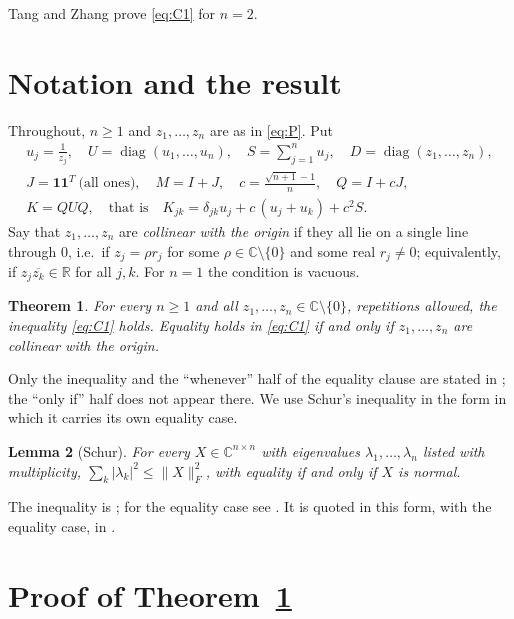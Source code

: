 \documentclass[11pt]{amsart}
\newtheorem{theorem}{Theorem}
\newtheorem{lemma}[theorem]{Lemma}
\theoremstyle{remark}
\newcommand{\CC}{\mathbb{C}}
\newcommand{\RR}{\mathbb{R}}
\newcommand{\Frob}[1]{\lVert #1\rVert_F}
\newcommand{\diag}{\operatorname{diag}}
\begin{document}
Tang and Zhang prove \eqref{eq:C1} for $n=2$.

\section{Notation and the result}

Throughout, $n\ge1$ and $z_1,\ldots,z_n$ are as in \eqref{eq:P}. Put
\begin{gather}
  u_j=\frac{1}{z_j},\quad
  U=\diag(u_1,\ldots,u_n),\quad
  S=\sum_{j=1}^{n}u_j,\quad
  D=\diag(z_1,\ldots,z_n),
  \label{eq:notation}\\
  J=\mathbf{1}\mathbf{1}^{T}\ \text{(all ones)},\quad
  M=I+J,\quad
  c=\frac{\sqrt{n+1}-1}{n},\quad
  Q=I+cJ,
  \label{eq:notation2}\\
  K=QUQ,
  \quad\text{that is}\quad
  K_{jk}=\delta_{jk}u_j+c\,(u_j+u_k)+c^{2}S .
  \label{eq:K}
\end{gather}
Say that $z_1,\ldots,z_n$ are \emph{collinear with the origin} if they all lie
on a single line through $0$, i.e.\ if $z_j=\rho r_j$ for some
$\rho\in\CC\setminus\{0\}$ and some real $r_j\ne0$; equivalently, if
$z_j\overline{z_k}\in\RR$ for all $j,k$. For $n=1$ the condition is vacuous.

\begin{theorem}\label{thm:main}
For every $n\ge1$ and all $z_1,\ldots,z_n\in\CC\setminus\{0\}$, repetitions
allowed, the inequality \eqref{eq:C1} holds. Equality holds in \eqref{eq:C1}
if and only if $z_1,\ldots,z_n$ are collinear with the origin.
\end{theorem}

Only the inequality and the ``whenever'' half of the equality clause are
stated in \cite{TZ}; the ``only if'' half does not appear there. We use Schur's
inequality in the form in which it carries its own equality case.

\begin{lemma}[Schur]\label{lem:schur}
For every $X\in\CC^{n\times n}$ with eigenvalues $\lambda_1,\ldots,\lambda_n$
listed with multiplicity, $\sum_k|\lambda_k|^{2}\le\Frob{X}^{2}$, with equality
if and only if $X$ is normal.
\end{lemma}

The inequality is \cite{Schur}; for the equality case see
\cite[\S2.5]{HornJohnson}. It is quoted in this form, with the equality case,
in \cite{TZ}.

\section{Proof of Theorem~\ref{thm:main}}
\end{document}
